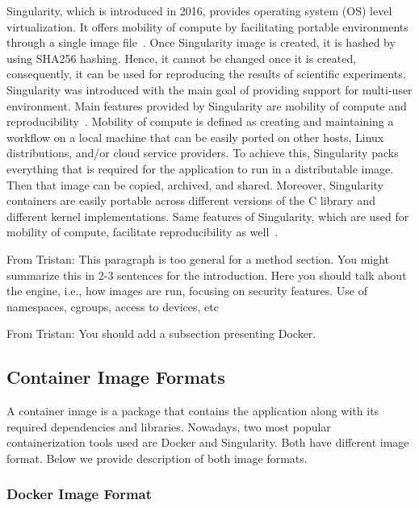 \documentclass[a4paper,num-refs]{oup-contemporary}
\newcommand{\TG}[1]{\color{blue}From Tristan: #1 \color{black}}
\begin{document}
Singularity, which is introduced in 2016, provides operating system (OS) level
virtualization.
It offers mobility of compute by facilitating portable environments 
through a single image file~\cite{kurtzer2016singularity}. Once Singularity image
is created, it is hashed by using SHA256 hashing. Hence, it cannot be changed
once it is created, consequently, it can be used for reproducing the results of
scientific experiments. Singularity was introduced with the main goal of
providing support for multi-user environment. Main features provided by
Singularity are mobility of compute and reproducibility~\cite{kurtzer2017singularity}.
Mobility of compute is defined as creating and maintaining a workflow on
a local machine that can be easily ported on other hosts, Linux distributions,
and/or cloud service providers. To achieve this, Singularity packs everything
that is required for the application to run in a distributable image. Then that
image can be copied, archived, and shared. Moreover, Singularity containers
are easily portable across different versions of the C library and different kernel
implementations.
Same features of Singularity, which are used for mobility of compute,
facilitate reproducibility as well~\cite{sochat2017enhancing}.

\TG{This paragraph is too general for a method section. You might summarize this in
2-3 sentences for the introduction. Here you should talk about the engine,
i.e., how images are run, focusing on security features. Use of namespaces,
cgroups, access to devices, etc}

\TG{You should add a subsection presenting Docker.}

\subsection{Container Image Formats}

A container image is a package that contains the application along with its
required dependencies and libraries.
Nowadays, two most popular containerization tools used are Docker and Singularity.
Both have different image format. Below we provide description of both image
formats.

\subsubsection{Docker Image Format}
\end{document}
